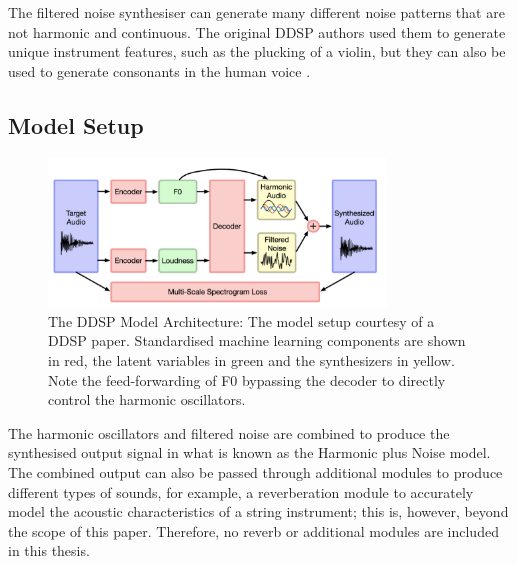 \vspace{0.5cm}
\vspace{0.5cm}

The filtered noise synthesiser can generate many different noise patterns that are not harmonic and continuous. The original DDSP authors used them to generate unique instrument features, such as the plucking of a violin, but they can also be used to generate consonants in the human voice \cite{SingingDDSP}.

\subsection{Model Setup}

\begin{figure}[H]
    \centering
    \includegraphics[width=0.8\textwidth]{literature_review/DDSPArchitecture.png}
    \caption{The DDSP Model Architecture: The model setup courtesy of a DDSP paper\cite{SingingDDSP}. Standardised machine learning components are shown in red, the latent variables in green and the synthesizers in yellow. Note the feed-forwarding of F0 bypassing the decoder to directly control the harmonic oscillators.}
    \label{fig:ddsp_model_setup}
\end{figure}

The harmonic oscillators and filtered noise are combined to produce the synthesised output signal in what is known as the Harmonic plus Noise model. The combined output can also be passed through additional modules to produce different types of sounds, for example, a reverberation module to accurately model the acoustic characteristics of a string instrument; this is, however, beyond the scope of this paper. Therefore, no reverb or additional modules are included in this thesis.

